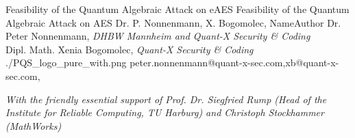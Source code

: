 \documentclass[a4paper,11pt]{article}
\begin{document}
\setcounter{footnote}{0}
\setcounter{figure}{0}



\Aufsatz 
{Feasibility of the Quantum Algebraic Attack on eAES}
{Feasibility  of the Quantum Algebraic Attack on AES}
{Dr. P. Nonnenmann, X. Bogomolec,}
{NameAuthor}
{Dr. Peter Nonnenmann,
{\small \textit{DHBW Mannheim and Quant-X Security {\&} Coding}} \\
Dipl. Math. Xenia Bogomolec, 
{\small \textit{Quant-X Security {\&} Coding}} \\}
{./PQS_logo_pure_with.png}
{peter.nonnenmann@quant-x-sec.com,xb@quant-x-sec.com,} 

\noindent
{\small \textit{With the friendly essential support of Prof. Dr. Siegfried Rump (Head of the Institute for Reliable Computing, TU Harburg) and Christoph Stockhammer (MathWorks)}}
\end{document}
